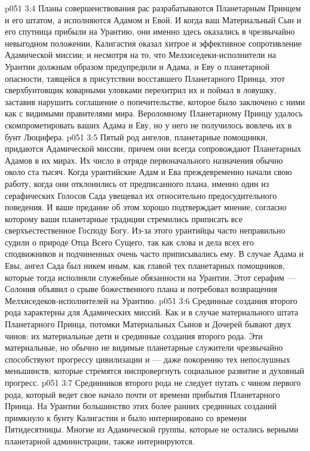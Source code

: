 \vs p051 3:4 Планы совершенствования рас разрабатываются Планетарным Принцем и его штатом, а исполняются Адамом и Евой. И когда ваш Материальный Сын и его спутница прибыли на Урантию, они именно здесь оказались в чрезвычайно невыгодном положении, Калигастия оказал хитрое и эффективное сопротивление Адамической миссии; и несмотря на то, что Мелхиседеки\hyp{}исполнители на Урантии должным образом предупредили и Адама, и Еву о планетарной опасности, таящейся в присутствии восставшего Планетарного Принца, этот сверхбунтовщик коварными уловками перехитрил их и поймал в ловушку, заставив нарушить соглашение о попечительстве, которое было заключено с ними как с видимыми правителями мира. Вероломному Планетарному Принцу удалось скомпрометировать ваших Адама и Еву, но у него не получилось вовлечь их в бунт Люцифера.
\vs p051 3:5 \pc Пятый род ангелов, планетарные помощники, придаются Адамической миссии, причем они всегда сопровождают Планетарных Адамов в их мирах. Их число в отряде первоначального назначения обычно около ста тысяч. Когда урантийские Адам и Ева преждевременно начали свою работу, когда они отклонились от предписанного плана, именно один из серафических Голосов Сада увещевал их относительно предосудительного поведения. И ваше предание об этом хорошо подтверждает мнение, согласно которому ваши планетарные традиции стремились приписать все сверхъестественное Господу Богу. Из\hyp{}за этого урантийцы часто неправильно судили о природе Отца Всего Сущего, так как слова и дела всех его сподвижников и подчиненных очень часто приписывались ему. В случае Адама и Евы, ангел Сада был никем иным, как главой тех планетарных помощников, которые тогда исполняли служебные обязанности на Урантии. Этот серафим --- Солония объявил о срыве божественного плана и потребовал возвращения Мелхиседеков\hyp{}исполнителей на Урантию.
\vs p051 3:6 \pc Срединные создания второго рода характерны для Адамических миссий. Как и в случае материального штата Планетарного Принца, потомки Материальных Сынов и Дочерей бывают двух чинов: их материальные дети и срединные создания второго рода. Эти материальные, но обычно не видимые планетарные служители чрезвычайно способствуют прогрессу цивилизации и --- даже покорению тех непослушных меньшинств, которые стремятся ниспровергнуть социальное развитие и духовный прогресс.
\vs p051 3:7 Срединников второго рода не следует путать с чином первого рода, который ведет свое начало почти от времени прибытия Планетарного Принца. На Урантии большинство этих более ранних срединных созданий примкнуло к бунту Калигастии и было интернировано со времени Пятидесятницы. Многие из Адамической группы, которые не остались верными планетарной администрации, также интернируются.
